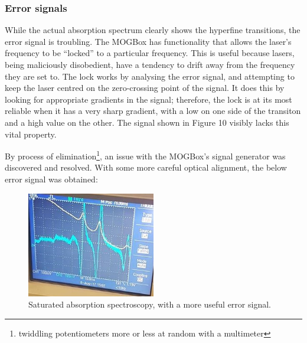 \documentclass[11pt,twoside,a4paper]{article}
\begin{document}
\subsubsection{Error signals}
While the actual absorption spectrum clearly shows the hyperfine transitions, the error signal is troubling. The MOGBox has functionality that allows the laser's frequency
to be ``locked'' to a particular frequency. This is useful because lasers, being maliciously disobedient, have a tendency to drift away from the frequency they are set to. The lock works by analysing
the error signal, and attempting to keep the laser centred on the zero-crossing point of the signal. It does this by looking for appropriate gradients in the signal; therefore, the lock is at its most
reliable when it has a very sharp gradient, with a low on one side of the transiton and a high value on the other. The signal shown in Figure 10 visibly lacks this vital property.

By process of elimination\footnote{twiddling potentiometers more or less at random with a multimeter}, an issue with the MOGBox's signal generator was discovered and resolved. With some more careful
optical alignment, the below error signal was obtained:
\begin{figure}[h]
    \centering
    \includegraphics[width=0.5\textwidth]{images/satabs-good-erro}
    \caption{Saturated absorption spectroscopy, with a more useful error signal.}
\end{figure}
\end{document}
